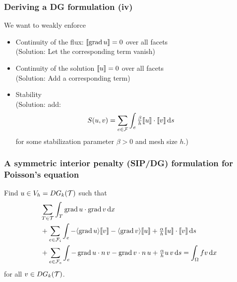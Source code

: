 \documentclass{fenicscourse}
\begin{document}
\begin{frame}
  \frametitle{Deriving a DG formulation (iv)}

  We want to weakly enforce
  \begin{itemize}
    \item
      Continuity of the flux: $\llbracket \operatorname{\mathrm{grad}} u \rrbracket = 0$ over all facets \\
      (Solution: Let the corresponding term vanish)
    \item
      Continuity of the solution $\llbracket u \rrbracket = 0$ over all facets \\
      (Solution: Add a corresponding term)
    \item
      Stability \\
      (Solution: add:
      \begin{equation*}
        S(u, v) = \sum_{e \in \mathcal{F}} \int_{e} \tfrac{\beta}{h} \llbracket u \rrbracket \cdot \llbracket v \rrbracket \, \mathrm{d}s \quad
      \end{equation*}
      for some stabilization parameter $\beta > 0$ and mesh size $h$.)
  \end{itemize}
\end{frame}

\begin{frame}
  \frametitle{A symmetric interior penalty (SIP/DG) formulation for Poisson's equation}

  Find $u \in V_h = DG_k(\mathcal{T})$ such that
  \begin{equation*}
    \begin{split}
      &\sum_{T \in \mathcal{T} } \int_{T} \operatorname{\mathrm{grad}} u \cdot \operatorname{\mathrm{grad}} v \, \mathrm{d}x \\
      &+ \sum_{e \in \mathcal{F}_i } \int_{e} - \langle \operatorname{\mathrm{grad}} u \rangle \llbracket v \rrbracket  - \langle \operatorname{\mathrm{grad}} v \rangle \llbracket u \rrbracket + \tfrac{\alpha}{h} \llbracket u \rrbracket \cdot \llbracket v \rrbracket \, \mathrm{d}s \\
      & + \sum_{e \in \mathcal{F}_e } \int_{e} - \operatorname{\mathrm{grad}} u \cdot n \, v - \operatorname{\mathrm{grad}} v \cdot n \, u + \tfrac{\alpha}{h} u \, v \, \mathrm{d}s
      = \int_{\Omega} f v \, \mathrm{d}x
    \end{split}
  \end{equation*}
  for all $v \in DG_k(\mathcal{T})$.

\end{frame}

%
%


\end{document}
